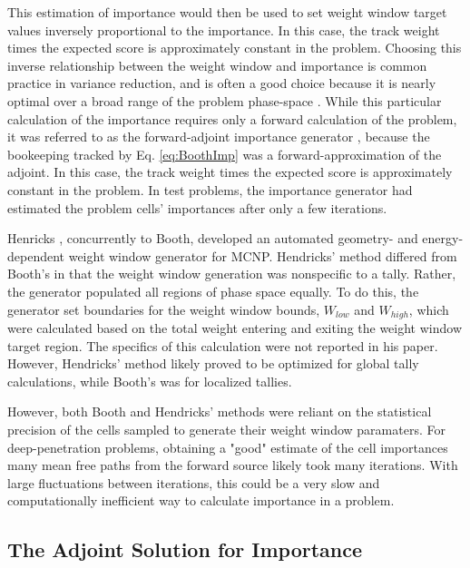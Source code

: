 This estimation of importance would then be used to set
weight window target values inversely proportional to the importance.
In this case, the track weight times the expected score is approximately
constant in the problem. Choosing this inverse relationship between the weight
window and importance is common practice in variance reduction, and is often a
good choice because it is nearly optimal over a broad range of the problem
phase-space \cite{booth_common_2012}.
While this
particular calculation of the importance requires only a forward calculation of
the problem, it was referred to as the forward-adjoint importance generator
\cite{booth_automatic_1982, booth_deep_1982, booth_importance_1984}, because the
bookeeping tracked by Eq. \eqref{eq:BoothImp} was a forward-approximation of the
adjoint.
In this case, the track weight times the expected score is approximately
constant in the problem.
In test problems, the importance generator had estimated the problem cells'
importances after only a few iterations.

Henricks \cite{hendricks_code-generated_1982}, concurrently to Booth, developed
an automated geometry- and energy-dependent weight window generator for MCNP.
Hendricks' method differed from Booth's in that the weight window generation was
nonspecific to a tally.
Rather, the generator populated all regions of phase space equally.
To do this, the generator set boundaries for the weight window bounds, $W_{low}$
and $W_{high}$, which were calculated based on the total weight entering and
exiting the weight window target region. The specifics of this calculation were
not reported in his paper. However, Hendricks' method likely proved to be
optimized for global tally calculations, while Booth's was for localized
tallies.

However, both Booth and Hendricks' methods were reliant on the statistical
precision of the cells sampled to generate their weight window paramaters. For
deep-penetration problems, obtaining a "good" estimate of the cell importances
many mean free paths from the forward source likely took many iterations. With
large fluctuations between iterations, this could be a very slow and
computationally inefficient way to calculate importance in a problem.

\subsection{The Adjoint Solution for Importance}
\label{sec:AdjointImportance}

